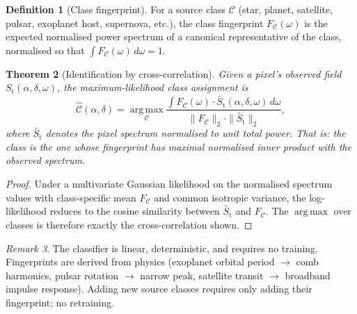 \documentclass[11pt,twocolumn,a4paper]{article}
\newtheorem{theorem}{Theorem}[section]
\theoremstyle{definition}
\newtheorem{definition}[theorem]{Definition}
\theoremstyle{remark}
\newtheorem{remark}[theorem]{Remark}
\newcommand{\Sfield}{S_{\mathrm{t}}}
\newcommand{\RA}{\alpha}
\newcommand{\Dec}{\delta}
\begin{document}
\begin{definition}[Class fingerprint]
For a source class $\mathcal{C}$ (star, planet, satellite, pulsar,
exoplanet host, supernova, etc.), the class fingerprint
$F_\mathcal{C}(\omega)$ is the expected normalised power spectrum of
a canonical representative of the class, normalised so that
$\int F_\mathcal{C}(\omega)\,d\omega = 1$.
\end{definition}

\begin{theorem}[Identification by cross-correlation]
\label{thm:classification}
Given a pixel's observed field $\Sfield(\RA, \Dec, \omega)$, the
maximum-likelihood class assignment is
\begin{equation}
\hat{\mathcal{C}}(\RA, \Dec) = \operatorname*{arg\,max}_{\mathcal{C}} \frac{\int F_\mathcal{C}(\omega) \cdot \widetilde{\Sfield}(\RA, \Dec, \omega)\,d\omega}{\|F_\mathcal{C}\|_2 \cdot \|\widetilde{\Sfield}\|_2},
\end{equation}
where $\widetilde{\Sfield}$ denotes the pixel spectrum normalised to
unit total power. That is: the class is the one whose fingerprint has
maximal normalised inner product with the observed spectrum.
\end{theorem}

\begin{proof}
Under a multivariate Gaussian likelihood on the normalised spectrum
values with class-specific mean $F_\mathcal{C}$ and common isotropic
variance, the log-likelihood reduces to the cosine similarity between
$\widetilde{\Sfield}$ and $F_\mathcal{C}$. The $\operatorname{arg\,max}$
over classes is therefore exactly the cross-correlation shown.
\end{proof}

\begin{remark}
The classifier is linear, deterministic, and requires no training.
Fingerprints are derived from physics (exoplanet orbital period $\to$
comb harmonics, pulsar rotation $\to$ narrow peak, satellite transit
$\to$ broadband impulse response). Adding new source classes
requires only adding their fingerprint; no retraining.
\end{remark}
\end{document}
